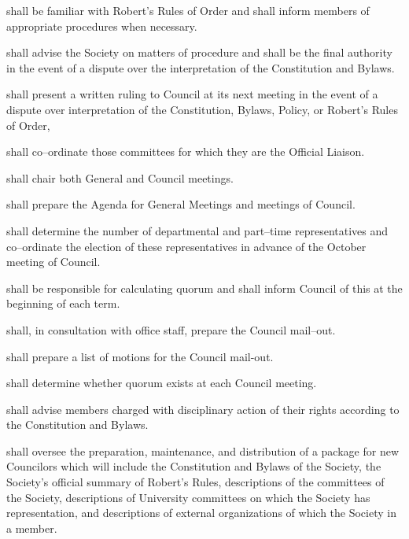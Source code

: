 \begin{longenum}[ label*=\thesubsection.\arabic*., align=left]
	\item shall be familiar with Robert's Rules of Order and shall inform members of  appropriate procedures when necessary.
    \item shall advise the Society on matters of procedure and shall be the final authority in the event of a dispute over the interpretation of the Constitution and Bylaws.
    \item shall present a written ruling to Council at its  next meeting in the event of a dispute over interpretation of the Constitution, Bylaws, Policy, or Robert's Rules of Order,
    \item shall co--ordinate those committees for which they are the Official Liaison.
    \item shall chair both General and Council meetings.
    \item shall prepare the Agenda for General Meetings and meetings of Council.
    \item shall determine the number of departmental and part--time representatives and co--ordinate the election of these representatives in advance of the October meeting of Council.
    \item shall be responsible for calculating quorum and shall inform Council of this at the beginning of each term.
    \item shall, in consultation with office staff, prepare the Council mail--out.
    \item shall prepare a list of motions for the Council mail-out.
    \item shall determine whether quorum exists at each Council meeting.
    \item shall advise members charged with disciplinary action of their rights according to the Constitution and Bylaws.
    \item shall oversee the preparation, maintenance, and distribution of a package for new Councilors which will include the Constitution and Bylaws of the Society, the Society's official summary of Robert's Rules, descriptions of the committees of the Society, descriptions of University committees on which the Society has representation, and descriptions of external organizations of which the Society in a member.

\end{longenum}
